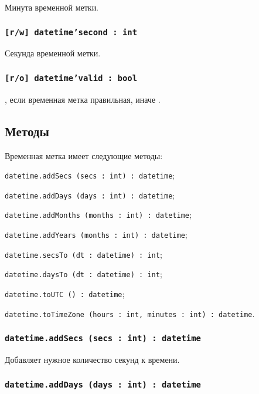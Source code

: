 Минута временной метки.

\subsubsection{\texttt{[r/w] datetime'second : int}}

Секунда временной метки.

\subsubsection{\texttt{[r/o] datetime'valid : bool}}

\true, если временная метка правильная, иначе \false.

\subsection{Методы}

Временная метка имеет следующие методы:
\begin{icItems}
	\item \texttt{datetime.addSecs (secs : int) : datetime};
	\item \texttt{datetime.addDays (days : int) : datetime};
	\item \texttt{datetime.addMonths (months : int) : datetime};
	\item \texttt{datetime.addYears (months : int) : datetime};
	\item \texttt{datetime.secsTo (dt : datetime) : int};
	\item \texttt{datetime.daysTo (dt : datetime) : int};
	\item \texttt{datetime.toUTC () : datetime};
	\item \texttt{datetime.toTimeZone (hours : int, minutes : int) : datetime}.
\end{icItems}

\subsubsection{\texttt{datetime.addSecs (secs : int) : datetime}}

Добавляет нужное количество секунд к времени.

\subsubsection{\texttt{datetime.addDays (days : int) : datetime}}

